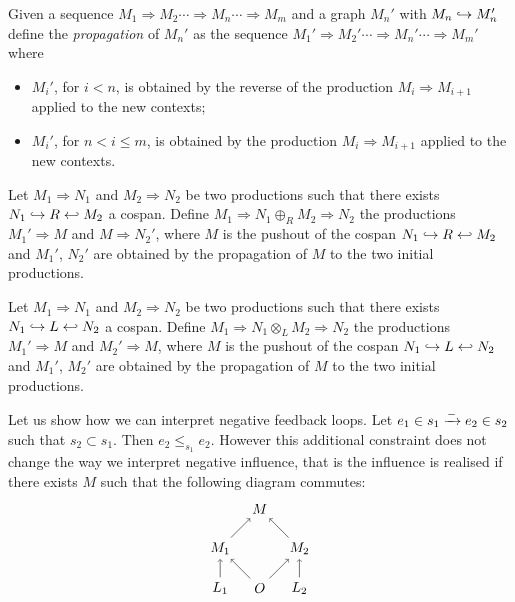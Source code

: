 \begin{definition}
  \label{def:propagate}
  Given a sequence $M_1{\Rightarrow} M_2\cdots {\Rightarrow} M_n\cdots {\Rightarrow} M_{m}$ and a graph $M_{n}'$ with $M_n\hookrightarrow M_{n}'$ define the \emph{propagation} of $M_{n}'$ as the sequence  $M_1'{\Rightarrow} M_2'\cdots {\Rightarrow} M_n'\cdots {\Rightarrow} M_{m}'$ where
  \begin{itemize}
  \item $M_i'$, for $i<n$, is obtained by the reverse of the production $M_i\Rightarrow M_{i+1}$ applied to the new contexts;
  \item $M_i'$, for $n<i\leq m$, is obtained by the production $M_i\Rightarrow M_{i+1}$ applied to the new contexts.
  \end{itemize}
\end{definition}

\begin{definition}
\label{def:seq_comb}
  Let $M_1\Rightarrow N_1$ and $M_2\Rightarrow N_2$ be two productions such that there exists $N_1\hookrightarrow R \hookleftarrow M_2$ a cospan.
  Define $M_1\Rightarrow N_1\oplus_R M_2\Rightarrow N_2$ the productions $M_1'\Rightarrow M$ and $M\Rightarrow N_2'$, where $M$ is the pushout of the cospan $N_1\hookrightarrow R \hookleftarrow M_2$ and $M_1'$, $N_2'$ are obtained by the propagation of $M$ to the two initial productions.
\end{definition}

\begin{definition}
\label{def:conc_comb}
  Let $M_1\Rightarrow N_1$ and $M_2\Rightarrow N_2$ be two productions such that there exists $N_1\hookrightarrow L \hookleftarrow N_2$ a cospan.
  Define $M_1\Rightarrow N_1\otimes_L M_2\Rightarrow N_2$ the productions $M_1'\Rightarrow M$ and $M_2'\Rightarrow M$, where $M$ is the pushout of the cospan $N_1\hookrightarrow L \hookleftarrow N_2$ and $M_1'$, $M_2'$ are obtained by the propagation of $M$ to the two initial productions.
\end{definition}

\begin{example}
Let us show how we can interpret negative feedback loops. Let $e_1\in s_1\mathrel{\xrightarrow{-}} e_2\in s_2$ such that $s_2\subset s_1$. Then $e_2\leq_{s_1} e_2$. However this additional constraint does not change the way we interpret negative influence, that is the influence is realised if there exists $M$ such that the following diagram commutes:
\[
\begin{tikzpicture} %
  \node (o) at (0,0) {\(O\)};
  \node (n) at (0,2) {\(M\)};
  \node (l1) at (-1,0) {\(L_1\)};
  \node (l2) at (1,0) {\(L_2\)};
  \node (n1) at (-1,1) {\(M_1\)};
  \node (n2) at (1,1) {\(M_2\)};
  \draw [->] (l1) -- (n1);
  \draw [->] (l2) -- (n2);
  \draw [->] (o) -- (n1);
  \draw [->] (o) -- (n2);
  \draw [->] (n1) -- (n);
  \draw [->] (n2) -- (n);
\end{tikzpicture}
\]
\end{example}

